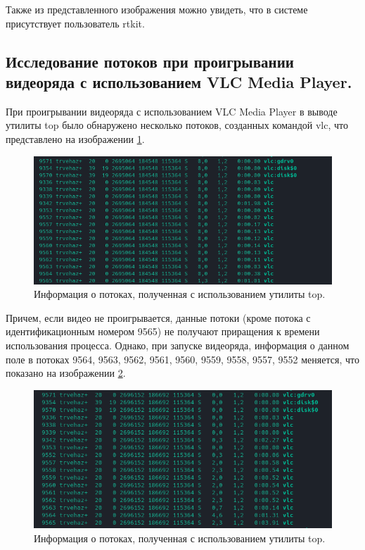 Также из представленного изображения можно увидеть, что в системе присутствует пользователь rtkit.

\subsection{Исследование потоков при проигрывании видеоряда с использованием VLC Media Player. }
При проигрывании видеоряда с использованием VLC Media Player в выводе утилиты top было обнаружено несколько потоков, созданных командой vlc, что представлено на изображении \ref{fig:vlcThreads}.

\begin{figure}[H]
	\centering
	\includegraphics[scale=0.8]{img/vlcThreads.png}
	\caption{Информация о потоках, полученная с использованием утилиты top. }
	\label{fig:vlcThreads}
\end{figure}

Причем, если видео не проигрывается, данные потоки (кроме потока с идентификационным номером 9565) не получают приращения к времени использования процесса. Однако, при запуске видеоряда, информация о данном поле в потоках 9564, 9563, 9562, 9561, 9560, 9559, 9558, 9557, 9552 меняется, что показано на изображении \ref{fig:vlcThreadsAfter}.

\begin{figure}[H]
	\centering
	\includegraphics[scale=0.8]{img/vlcThreadsAfter.png}
	\caption{Информация о потоках, полученная с использованием утилиты top. }
	\label{fig:vlcThreadsAfter}
\end{figure}

